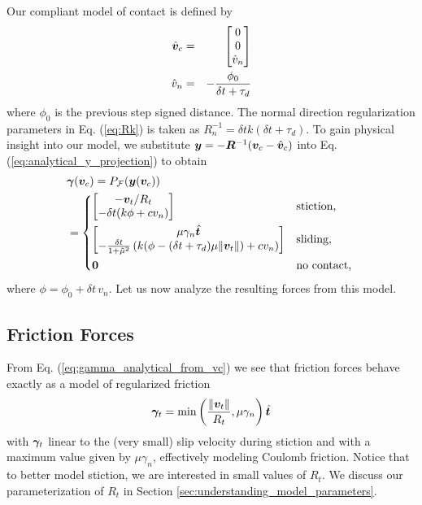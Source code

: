 Our compliant model of contact is defined by
\begin{eqnarray}
	\hat{{\bm{v}}}_c &=&
	\begin{bmatrix}
		0\\
		0\\
		\hat{v}_n \end{bmatrix}\nonumber\\
	\hat{v}_n &=& -\frac{\phi_0}{\delta t+\tau_d}
\end{eqnarray}
where $\phi_0$ is the previous step signed distance. The normal direction
regularization parameters in Eq. (\ref{eq:Rk}) is taken as $R_n^{-1} = \delta t
k(\delta t+\tau_d)$. To gain physical insight into our model, we substitute
${\bm{y}}=-{\bm{R}}^{-1}({\bm{v}}_c - \hat{{\bm{v}}}_c)$ into Eq.
(\ref{eq:analytical_y_projection}) to obtain
\begin{align}
	&\bgamma(\vf{v}_c) = P_\mathcal{F}(\vf{y}(\vf{v}_c))
    \label{eq:gamma_analytical_from_vc}\\
&=\begin{dcases}
	\begin{bmatrix}
		-\vf{v}_t/R_t\\
		-\delta t(k\phi + c v_n)
	\end{bmatrix}
	& \text{stiction, } \\
	\begin{bmatrix}
		\mu\gamma_n\hat{\vf{t}}\\
		-\frac{\delta t}{1+\tilde\mu^2}\left(k(\phi-(\delta
		t+\tau_d)\mu\Vert\vf{v}_t\Vert) + cv_n \right)
	\end{bmatrix}
	& \text{sliding, }\\
    \vf{0} & \text{no contact, } \end{dcases}\nonumber	
\end{align}
where $\phi= \phi_0 + \delta t\,v_n$. Let us now analyze the resulting forces
from this model.

\subsection{Friction Forces}
From Eq. (\ref{eq:gamma_analytical_from_vc}) we see that friction forces behave
exactly as a model of regularized friction
\begin{equation}
	{\bm\gamma}_t = \min\left(\frac{\Vert{\bm{v}}_t\Vert}{R_t}, \mu\gamma_n\right)\hat{{\bm{t}}}
\end{equation}
with ${\bm\gamma}_t$ linear to the (very small) slip velocity during stiction and
with a maximum value given by $\mu\gamma_n$, effectively modeling Coulomb
friction. Notice that to better model stiction, we are interested in small
values of $R_t$. We discuss our parameterization of $R_t$ in
Section \ref{sec:understanding_model_parameters}.

